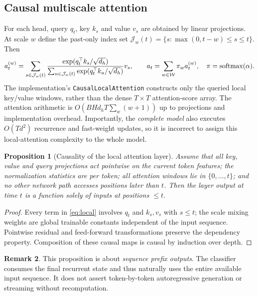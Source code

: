 \documentclass[11pt,a4paper]{article}
\theoremstyle{plain}\newtheorem{theorem}{Theorem}[section]\newtheorem{proposition}[theorem]{Proposition}\newtheorem{lemma}[theorem]{Lemma}
\theoremstyle{definition}\newtheorem{definition}[theorem]{Definition}\newtheorem{remark}[theorem]{Remark}\newtheorem{counterexample}[theorem]{Counterexample}
\begin{document}
\subsection{Causal multiscale attention}
For each head, query $q_t$, key $k_s$ and value $v_s$ are obtained by linear projections. At scale $w$ define the past-only index set $\mathcal J_w(t)=\{s: \max(0,t-w)\le s\le t\}$. Then
\begin{equation}\label{eq:local}
 a_t^{(w)}=\sum_{s\in\mathcal J_w(t)}\frac{\exp(q_t^\top k_s/\sqrt{d_h})}{\sum_{u\in\mathcal J_w(t)}\exp(q_t^\top k_u/\sqrt{d_h})}v_s,
 \qquad a_t=\sum_{w\in\mathcal W}\pi_w a_t^{(w)},\quad \pi=\operatorname{softmax}(\alpha).
\end{equation}
The implementation's \verb|CausalLocalAttention| constructs only the queried local key/value windows, rather than the dense $T\times T$ attention-score array. The attention arithmetic is $O(BHd_hT\sum_w(w+1))$ up to projections and implementation overhead. Importantly, the \emph{complete model} also executes $O(Td^2)$ recurrence and fast-weight updates, so it is incorrect to assign this local-attention complexity to the whole model.

\begin{proposition}[Causality of the local attention layer]\label{prop:causality}
Assume that all key, value and query projections act pointwise on the current token features; the normalization statistics are per token; all attention windows lie in $\{0,\ldots,t\}$; and no other network path accesses positions later than $t$. Then the layer output at time $t$ is a function solely of inputs at positions $\le t$.
\end{proposition}
\begin{proof}
Every term in \eqref{eq:local} involves $q_t$ and $k_s,v_s$ with $s\le t$; the scale mixing weights are global trainable constants independent of the input sequence. Pointwise residual and feed-forward transformations preserve the dependency property. Composition of these causal maps is causal by induction over depth.
\end{proof}
\begin{remark}
This proposition is about \emph{sequence prefix outputs}. The classifier consumes the final recurrent state and thus naturally uses the entire available input sequence. It does not assert token-by-token autoregressive generation or streaming without recomputation.
\end{remark}
\end{document}
